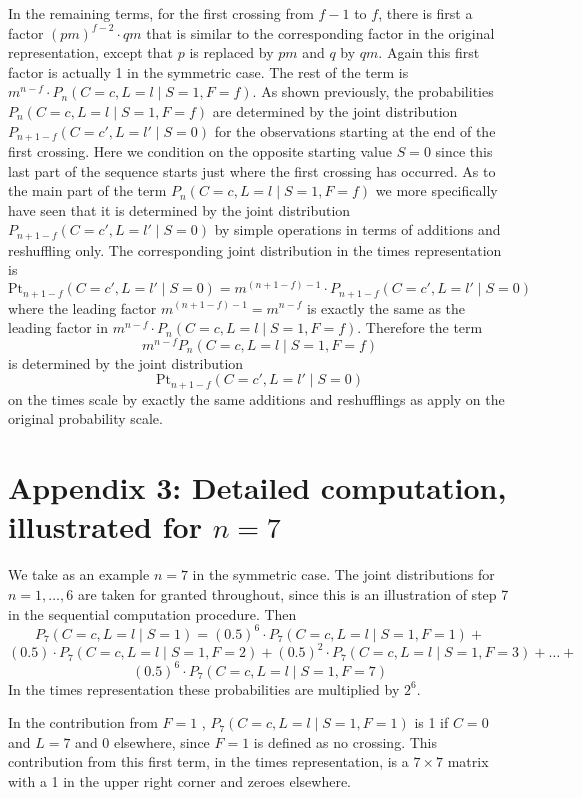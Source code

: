 In the remaining terms, for the first crossing from $f-1$ to $f$, there is first a factor $(pm)^{f-2} \cdot  qm$ that is similar to the corresponding factor in the original representation, except that $p$ is replaced by $pm$ and $q$ by $qm$. Again this first factor is actually 1 in the symmetric case. The rest of the term is $m^{n-f} \cdot P_n ( C=c, L=l \mid S=1, F=f)$. As shown previously, the probabilities $P_n ( C=c, L=l \mid S=1, F=f)$ are determined by the joint distribution $P_{n+1-f} ( C=c', L=l' \mid S=0)$ for the observations starting at the end of the first crossing. Here we condition on the opposite starting value $S=0$ since this last part of the sequence starts just where the first crossing has occurred. As to the main part of the term $P_n ( C=c, L=l \mid S=1, F=f)$ we more specifically have seen that it is determined by the joint distribution $P_{n+1-f} ( C=c', L=l' \mid S=0)$ by simple operations in terms of additions and reshuffling only. The corresponding joint distribution in the times representation is $$\text{Pt}_{n+1-f} ( C=c', L=l' \mid S=0)=m^{(n+1-f)-1} \cdot P_{n+1-f} ( C=c', L=l' \mid S=0)$$ where the leading factor $m^{(n+1-f)-1}=m^{n-f}$ is exactly the same as the leading factor in $m^{n-f} \cdot P_n ( C=c, L=l \mid S=1, F=f)$. Therefore the term $$m^{n-f} P_n ( C=c, L=l \mid S=1, F=f)$$ is determined by the joint distribution $$\text{Pt}_{n+1-f} ( C=c', L=l' \mid S=0)$$ on the times scale by exactly the same additions and reshufflings as apply on the original probability scale.

\section{Appendix 3: Detailed computation, illustrated for $n = 7$}

We take as an example $n=7$ in the symmetric case. The joint distributions for $n=1, \ldots, 6$ are taken for granted throughout, since this is an illustration of step 7 in the sequential computation procedure. Then $$P_7 (C=c, L=l \mid S=1) = (0.5)^6 \cdot   P_7 (C=c, L=l \mid S=1,F=1) +    $$  $$(0.5) \cdot P_7 (C=c, L=l \mid S=1,F=2) + (0.5)^2 \cdot P_7 (C=c, L=l \mid S=1,F=3) + \ldots  +$$ $$(0.5)^6 \cdot P_7 (C=c, L=l \mid S=1,F=7) $$
In the times representation these probabilities are multiplied by $2^6$. 

In the contribution from $F=1$ , $P_7 (C=c, L=l \mid S=1,F=1)$ is 1 if $C=0$ and $L=7$ and 0 elsewhere, since $F=1$ is defined as no crossing. This contribution from this first term, in the times representation, is a $7 \times 7$ matrix with a 1 in the upper right corner and zeroes elsewhere. 

